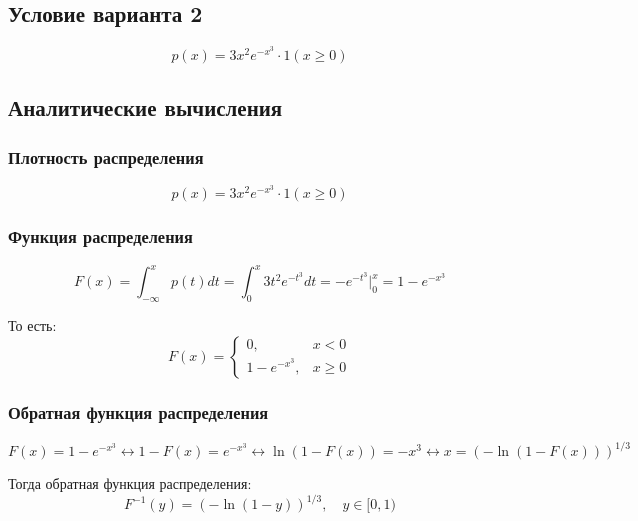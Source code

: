 \documentclass[a4paper,14pt]{extarticle}
\begin{document}
        \subsection*{Условие варианта 2}
            
            \[
                p(x) = 3x^2 e^{-x^3} \cdot 1(x \geq 0)
            \]
        
        \subsection*{Аналитические вычисления}
            
            \subsubsection*{Плотность распределения}
                \[
                    p(x) = 3x^2 e^{-x^3} \cdot 1(x \geq 0)
                \]
            
            \subsubsection*{Функция распределения}
                \[
                    F(x) =
                    \int_{-\infty}^{x} p(t) dt =
                    \int_{0}^{x} 3t^2 e^{-t^3} dt =
                    -e^{-t^3} \Big|_{0}^{x} =
                    1 - e^{-x^3}
                \]
                
                То есть:
                \[
                    F(x) = \begin{cases}
                               0, & x < 0 \\
                               1 - e^{-x^3}, & x \geq 0
                    \end{cases}
                \]
            
            \subsubsection*{Обратная функция распределения}
                \[
                    F(x) = 1 - e^{-x^3} \leftrightarrow
                    1 - F(x) = e^{-x^3} \leftrightarrow
                    \ln(1 - F(x)) = -x^3 \leftrightarrow
                    x = (-\ln(1 - F(x)))^{1/3}
                \]
                
                Тогда обратная функция распределения:
                \[
                    F^{-1}(y) = (-\ln(1 - y))^{1/3}, \quad y \in [0, 1)
                \]
            
\end{document}
